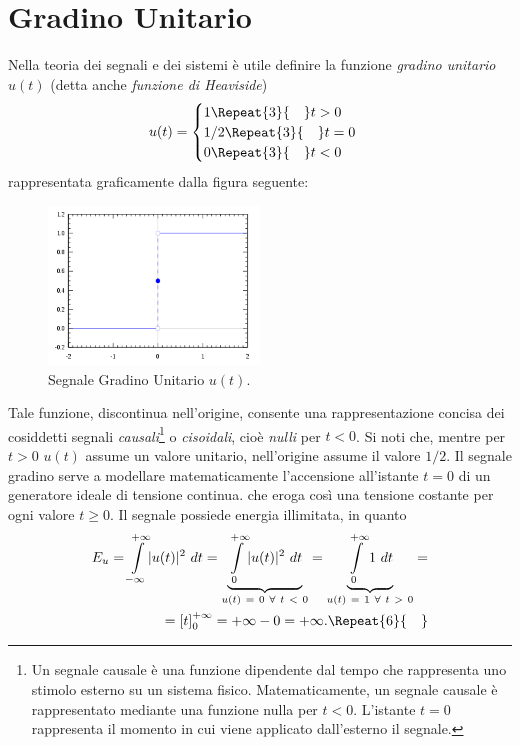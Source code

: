 \documentclass[12pt,oneside,openany]{memoir}
\numberwithin{equation}{subsection}
\DeclarePairedDelimiter{\abs}{\lvert}{\rvert}
\newcommand{\quads}[1]{\Repeat{#1}{\quad}}
\newcommand{\dt}{\ dt}
\begin{document}
\section{Gradino Unitario}
Nella teoria dei segnali e dei sistemi \`e utile definire la funzione \textit{gradino unitario} $u(t)$ (detta anche \textit{funzione di Heaviside})
\begin{equation}
	u(t) =
		\begin{cases}
			1 \quads{3} t > 0\\
			1/2 \quads{3} t = 0\\
			0 \quads{3} t < 0
		\end{cases}
\end{equation}
rappresentata graficamente dalla figura seguente:
\begin{figure}[H]
\centering
\captionsetup{justification=centering}
\includegraphics[width=0.5\textwidth]{images/heaviside_function.png}
\caption{Segnale Gradino Unitario $u(t)$.}
\end{figure}
Tale funzione, discontinua nell'origine, consente una rappresentazione concisa dei cosiddetti segnali \textit{causali}\footnote{Un segnale causale \`e una funzione dipendente dal tempo che rappresenta uno stimolo esterno su un sistema fisico. Matematicamente, un segnale causale \`e rappresentato mediante una funzione nulla per $t < 0$. L'istante $t = 0$ rappresenta il momento in cui viene applicato dall'esterno il segnale.} o \textit{cisoidali}, cio\`e \textit{nulli} per $t < 0$. Si noti che, mentre per $t > 0$ $u(t)$ assume un valore unitario, nell'origine assume il valore $1/2$.
\bigbreak
Il segnale gradino serve a modellare matematicamente l'accensione all'istante $t = 0$ di un generatore ideale di tensione continua. che eroga cos\`i una tensione costante per ogni valore $t \geq 0$. Il  segnale possiede energia illimitata, in quanto
\begin{equation}
	\begin{split}
		E_u = \int\displaylimits_{-\infty}^{+\infty} \abs{u(t)}^2 \dt = \underbrace{\int\displaylimits_{0}^{+\infty} \abs{u(t)}^2 \dt}_{u(t) \ = \ 0 \ \forall \ t \ < \ 0} = \underbrace{\int\displaylimits_{0}^{+\infty} 1 \dt}_{u(t) \ = \ 1 \ \forall \ t \ > \ 0} =
		\\
		= \left[ t \right]_0^{+\infty} = +\infty - 0 = +\infty.
		\quads{6}
	\end{split}
\end{equation}
\end{document}
